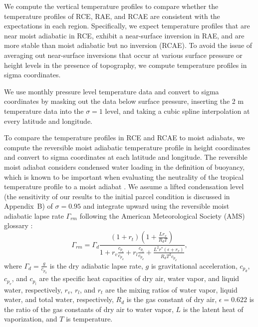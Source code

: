 \documentclass{ametsocV5}
\begin{document}
  \appendix[A]

    We compute the vertical temperature profiles to compare whether the temperature profiles of RCE, RAE, and RCAE are consistent with the expectations in each region. Specifically, we expect temperature profiles that are near moist adiabatic in RCE, exhibit a near-surface inversion in RAE, and are more stable than moist adiabatic but no inversion (RCAE). To avoid the issue of averaging out near-surface inversions that occur at various surface pressure or height levels in the presence of topography, we compute temperature profiles in sigma coordinates.
    
    We use monthly pressure level temperature data and convert to sigma coordinates by masking out the data below surface pressure, inserting the 2 m temperature data into the $\sigma=1$ level, and taking a cubic spline interpolation at every latitude and longitude. 

    To compare the temperature profiles in RCE and RCAE to moist adiabats, we compute the reversible moist adiabatic temperature profile in height coordinates and convert to sigma coordinates at each latitude and longitude. The reversible moist adiabat considers condensed water loading in the definition of buoyancy, which is known to be important when evaluating the neutrality of the tropical temperature profile to a moist adiabat \citep{xu1989}. We assume a lifted condensation level (the sensitivity of our results to the initial parcel condition is discussed in Appendix~B) of $\sigma=0.95$ and integrate upward using the reversible moist adiabatic lapse rate $\Gamma_{rm}$ following the American Meteorological Society (AMS) glossary \citep{ams2021}:
    \begin{equation}
      \Gamma_{rm} = \Gamma_d \frac{(1+r_t)\left(1+\frac{L r_v}{R_d T}\right)}{1+r_v\frac{c_{p_v}}{c_{p_d}}+r_l\frac{c_{p_l}}{c_{p_d}}+\frac{L^2 r^*(\epsilon+r_v)}{R_d T^2 c_{p_d}}},
    \end{equation}
    where $\Gamma_d=\frac{g}{c_{p_d}}$ is the dry adiabatic lapse rate, $g$ is gravitational acceleration, $c_{p_d}$, $c_{p_v}$, and $c_{p_l}$ are the specific heat capacities of dry air, water vapor, and liquid water, respectively, $r_v$, $r_l$, and $r_t$ are the mixing ratios of water vapor, liquid water, and total water, respectively, $R_d$ is the gas constant of dry air, $\epsilon=0.622$ is the ratio of the gas constants of dry air to water vapor, $L$ is the latent heat of vaporization, and $T$ is temperature.
\end{document}

